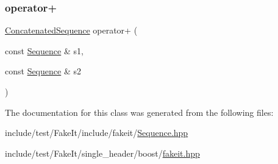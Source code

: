 \mbox{\label{classfakeit_1_1ConcatenatedSequence_adb09b1b1e32428d0c2f46bd549141cdd}} 
\subsubsection{\texorpdfstring{operator+}{operator+}\hspace{0.1cm}{\footnotesize\ttfamily [9/9]}}
{\footnotesize\ttfamily \mbox{\hyperlink{classfakeit_1_1ConcatenatedSequence}{Concatenated\+Sequence}} operator+ (\begin{DoxyParamCaption}\item[{const \mbox{\hyperlink{classfakeit_1_1Sequence}{Sequence}} \&}]{s1,  }\item[{const \mbox{\hyperlink{classfakeit_1_1Sequence}{Sequence}} \&}]{s2 }\end{DoxyParamCaption})\hspace{0.3cm}{\ttfamily [friend]}}



The documentation for this class was generated from the following files\+:\begin{DoxyCompactItemize}
\item 
include/test/\+Fake\+It/include/fakeit/\mbox{\hyperlink{Sequence_8hpp}{Sequence.\+hpp}}\item 
include/test/\+Fake\+It/single\+\_\+header/boost/\mbox{\hyperlink{single__header_2boost_2fakeit_8hpp}{fakeit.\+hpp}}\end{DoxyCompactItemize}
